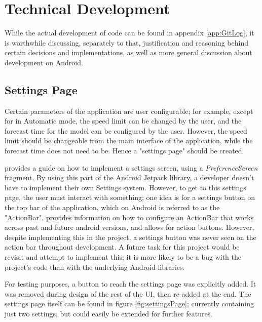 \documentclass[11pt, a4paper, notitlepage]{report}
\begin{document}
\chapter{Technical Development}
While the actual development of code can be found in appendix \ref{app:GitLog}, it is worthwhile discussing, separately to that, justification and reasoning behind certain decisions and implementations, as well as more general discussion about development on Android.

\section{Settings Page}
Certain parameters of the application are user configurable; for example, except for in Automatic mode, the speed limit can be changed by the user, and the forecast time for the model can be configured by the user. However, the speed limit should be changeable from the main interface of the application, while the forecast time does not need to be. Hence a "settings page" should be created.

\citet{settingsAndroid} provides a guide on how to implement a settings screen, using a \textit{PreferenceScreen} fragment. By using this part of the Android Jetpack library, a developer doesn't have to implement their own Settings system. However, to get to this settings page, the user must interact with something; one idea is for a settings button on the top bar of the application, which on Android is referred to as the "ActionBar". \citet{toolbarAndroid} provides information on how to configure an ActionBar that works across past and future android versions, and allows for action buttons. However, despite implementing this in the project, a settings button was never seen on the action bar throughout development. A future task for this project would be revisit and attempt to implement this; it is more likely to be a bug with the project's code than with the underlying Android libraries.

For testing purposes, a button to reach the settings page was explicitly added. It was removed during design of the rest of the UI, then re-added at the end. The settings page itself can be found in figure \ref{fig:settingsPage}; currently containing just two settings, but could easily be extended for further features.
\end{document}
